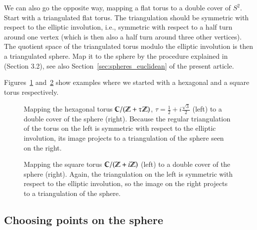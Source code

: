 \documentclass[Thesis]{subfiles}
\begin{document}
 We can
also go the opposite way, mapping a flat torus to a double cover of
$S^{2}$. Start with a triangulated flat torus. The triangulation
should be symmetric with respect to the elliptic involution, i.e.,
symmetric with respect to a half turn around one vertex (which is then
also a half turn around three other vertices). The quotient space of
the triangulated torus modulo the elliptic involution is then a
triangulated sphere. Map it to the sphere by the procedure explained
in~\cite{BPS2015:dconf} (Section 3.2), see also
Section~\ref{sec:spheres_euclidean} of the present article.

Figures~\ref{fig:wente_elliptic} and~\ref{fig:square_elliptic} show
examples where we started with a hexagonal and a square torus
respectively. 

\begin{figure}
\centering
{}
\caption{Mapping the hexagonal torus $\mathbb C/(\mathbb Z+\tau\mathbb Z)$,
  $\tau=\tfrac{1}{2}+i\tfrac{\sqrt 3}{2}$ (left) to a double cover of
  the sphere (right). Because the regular triangulation of the torus
  on the left is symmetric with respect to the elliptic involution,
  its image projects to a triangulation of the sphere seen on the right.} 
\label{fig:wente_elliptic}
\end{figure}

\begin{figure}
\centering
{}
\caption{ Mapping the square torus $\mathbb C/(\mathbb Z+i\mathbb Z)$ (left) to a double
  cover of the sphere (right). Again, the triangulation on the left
  is symmetric with respect to the elliptic involution, so the image
  on the right projects to a triangulation of the sphere.}
\label{fig:square_elliptic} 
\end{figure}


\subsection{Choosing points on the sphere}
\label{sec:spherical_triangulations}
\end{document}
